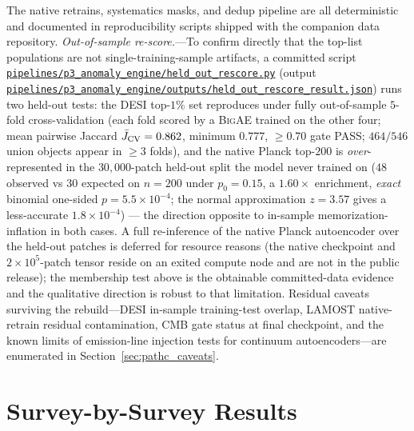 \documentclass[aps,prd,twocolumn,superscriptaddress,showpacs,preprintnumbers,nofootinbib,longbibliography,floatfix]{revtex4-2}
\newcommand{\repoBase}{https://github.com/Hubify-Projects/bigbounce/blob/main}
\newcommand{\artifact}[1]{\href{\repoBase/#1}{\nolinkurl{#1}}}
\newcommand{\BigAE}{\textsc{BigAE}}
\begin{document}
The native retrains, systematics masks, and dedup pipeline are all deterministic and documented in reproducibility scripts shipped with the companion data repository. \textit{Out-of-sample re-score.}---To confirm directly that the top-list populations are not single-training-sample artifacts, a committed script \artifact{pipelines/p3\_anomaly\_engine/held\_out\_rescore.py} (output \artifact{pipelines/p3\_anomaly\_engine/outputs/held\_out\_rescore\_result.json}) runs two held-out tests: the DESI top-$1\%$ set reproduces under fully out-of-sample $5$-fold cross-validation (each fold scored by a \BigAE{} trained on the other four; mean pairwise Jaccard $\bar{J}_{\rm CV}=0.862$, minimum $0.777$, $\geq\!0.70$ gate PASS; $464/546$ union objects appear in $\geq\!3$ folds), and the native Planck top-$200$ is \emph{over}-represented in the $30{,}000$-patch held-out split the model never trained on ($48$ observed vs $30$ expected on $n=200$ under $p_0=0.15$, a $1.60\times$ enrichment, \emph{exact} binomial one-sided $p=5.5\times10^{-4}$; the normal approximation $z=3.57$ gives a less-accurate $1.8\times10^{-4}$) --- the direction opposite to in-sample memorization-inflation in both cases. A full re-inference of the native Planck autoencoder over the held-out patches is deferred for resource reasons (the native checkpoint and $2\times10^{5}$-patch tensor reside on an exited compute node and are not in the public release); the membership test above is the obtainable committed-data evidence and the qualitative direction is robust to that limitation. Residual caveats surviving the rebuild---DESI in-sample training-test overlap, LAMOST native-retrain residual contamination, CMB gate status at final checkpoint, and the known limits of emission-line injection tests for continuum autoencoders---are enumerated in Section~\ref{sec:pathc_caveats}.


\section{Survey-by-Survey Results}\label{sec:surveys}
\end{document}
